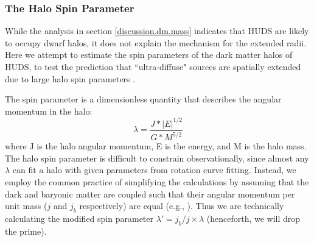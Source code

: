 \documentclass[twocolumn]{aastex6}
\newcommand{\msun}{M_{\odot}}
\def\msun{$M_\odot$}
\begin{document}


\subsubsection{The Halo Spin Parameter}
\label{discussion.dm.spin}

While the analysis in section \ref{discussion.dm.mass} indicates that HUDS are likely to occupy dwarf halos, it does not explain the mechanism for the extended radii. 
Here we attempt to estimate the spin parameters of the dark matter halos of HUDS, to test the prediction that ``ultra-diffuse" sources are spatially extended due to large halo spin parameters \citep{amorisco16a}.

The spin parameter is a dimensionless quantity that describes the angular momentum in the halo:
$$\lambda = \frac{J*|E|^{1/2}}{G*M^{5/2}}$$
where J is the halo angular momentum, E is the energy, and M is the halo mass. The halo spin parameter is difficult to constrain observationally, since almost any $\lambda$ can fit a halo with given parameters from rotation curve fitting. Instead, we employ the common practice of simplifying the calculations by assuming that the dark and baryonic matter are coupled such that their angular momentum per unit mass ($j$ and $j_b$ respectively) are equal (e.g., \citealp{mo98a}). 
Thus we are technically calculating the modified spin parameter $\lambda' = j_b/j \times \lambda$ (henceforth, we will drop the prime). 
\end{document}
